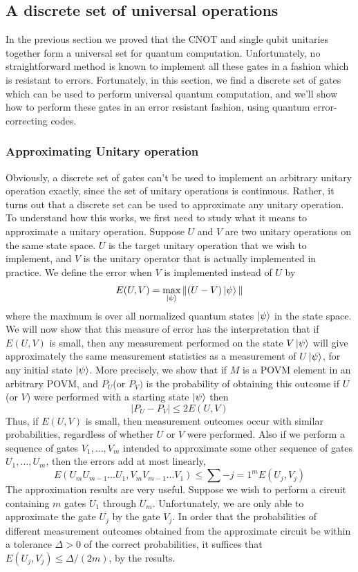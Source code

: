\subsection{A discrete set of universal operations}
In the previous section we proved that the CNOT and single qubit unitaries together form a universal set for quantum computation. Unfortunately, no straightforward method is known to implement all these gates in a fashion which is resistant to errors. Fortunately, in this section, we find a discrete set of gates which can be used to perform universal quantum computation, and we'll show how to perform these gates in an error resistant fashion, using quantum error-correcting codes.

\subsubsection{Approximating Unitary operation}
Obviously, a discrete set of gates can't be used to implement an arbitrary unitary operation exactly, since the set of unitary operations is continuous. Rather, it turns out that a discrete set can be used to approximate any unitary operation. To understand how this works, we first need to study what it means to approximate a unitary operation. Suppose $U$ and $V$ are two unitary operations on the same state space. $U$ is the target unitary operation that we wish to implement, and $V$ is the unitary operator that is actually implemented in practice. We define the error when $V$ is implemented instead of $U$ by
\[
E(U,V)=\max_{\ket{\psi}} \|(U-V)\ket{\psi}\|
\]
where the maximum is over all normalized quantum states $\ket{\psi}$ in the state space. We will now show that this measure of error has the interpretation that if $E(U,V)$ is small, then any measurement performed on the state $V\ket{\psi}$ will give approximately the same measurement statistics as a measurement of $U\ket{\psi}$, for any initial state $\ket{\psi}$. More precisely, we show that if $M$ is a POVM element in an arbitrary POVM, and $P_U$(or $P_V)$ is the probability of obtaining this outcome if $U$(or $V$) were performed with a starting state $\ket{\psi}$ then
\[
|P_U-P_V|\leq 2E(U,V)
\]
Thus, if $E(U,V)$ is small, then measurement outcomes occur with similar probabilities, regardless of whether $U$ or $V$ were performed. Also if we perform a sequence of gates $V_1,\ldots,V_m$ intended to approximate some other sequence of gates $U_1,\ldots,U_m$, then the errors add at most linearly,
\[
E(U_mU_{m-1}\ldots U_1, V_m V_{m-1} \ldots V_1)\leq \sum-{j=1}^m E(U_j,V_j)
\]
The approximation results are very useful. Suppose we wish to perform a circuit containing $m$ gates $U_1$ through $U_m$. Unfortunately, we are only able to approximate the gate $U_j$ by the gate $V_j$. In order that the probabilities of different measurement outcomes obtained from the approximate circuit be within a tolerance $\Delta >0$ of the correct probabilities, it suffices that $E(U_j,V_j)\leq \Delta /(2m)$, by the results.

